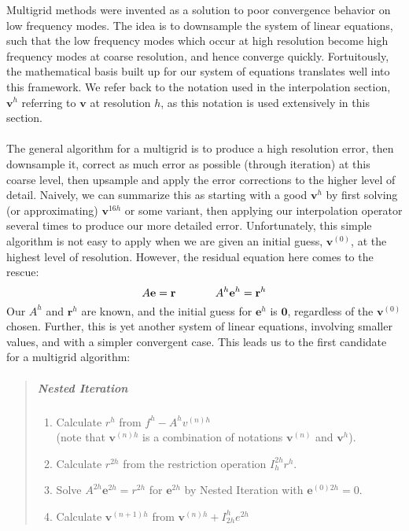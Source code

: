 Multigrid methods were invented as a solution to poor convergence behavior on low frequency modes. The idea is to downsample the system of linear equations, such that the low frequency modes which occur at high resolution become high frequency modes at coarse resolution, and hence converge quickly. Fortuitously, the mathematical basis built up for our system of equations translates well into this framework. We refer back to the notation used in the interpolation section, $\textbf{v}^h$ referring to $\textbf{v}$ at resolution $h$, as this notation is used extensively in this section.
\\\\
The general algorithm for a multigrid is to produce a high resolution error, then downsample it, correct as much error as possible (through iteration) at this coarse level, then upsample and apply the error corrections to the higher level of detail. Naively, we can summarize this as starting with a good $\textbf{v}^h$ by first solving (or approximating) $\textbf{v}^{16h}$ or some variant, then applying our interpolation operator several times to produce our more detailed error. Unfortunately, this simple algorithm is not easy to apply when we are given an initial guess, $\textbf{v}^{(0)}$, at the highest level of resolution. However, the residual equation here comes to the rescue:
\[A\textbf{e}=\textbf{r}\hspace{.5in} A^{h}\textbf{e}^{h}=\textbf{r}^{h}\]
Our $A^{h}$ and $\textbf{r}^{h}$ are known, and the initial guess for $\textbf{e}^{h}$ is $\textbf{0}$, regardless of the $\textbf{v}^{(0)}$ chosen. Further, this is yet another system of linear equations, involving smaller values, and with a simpler convergent case. This leads us to the first candidate for a multigrid algorithm:
\vspace{-.2in}
\begin{quote}
\item
\subparagraph{Nested Iteration \cite{lee14}}
\begin{enumerate}
\item Calculate $r^h$ from $f^h-A^h{v}^{(n)h}$\\
(note that $\textbf{v}^{(n)h}$ is a combination of notations $\textbf{v}^{(n)}$ and $\textbf{v}^h$).
\item Calculate $r^{2h}$ from the restriction operation $I_{h}^{2h}r^h$.
\item Solve $A^{2h}\textbf{e}^{2h}=r^{2h}$ for $\textbf{e}^{2h}$ by Nested Iteration with $\textbf{e}^{(0)2h}=0$.
\item Calculate $\textbf{v}^{(n+1)h}$ from
	$\textbf{v}^{(n)h}+I_{2h}^he^{2h}$
\end{enumerate}
\end{quote}
